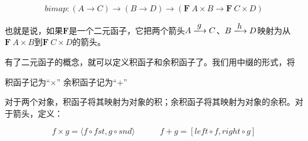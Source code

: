 \documentclass{article}
\begin{document}
\[
bimap : (A \to C) \to (B \to D) \to (\mathbf{F}\ A \times B \to \mathbf{F}\ C \times D)
\]

也就是说，如果$\mathbf{F}$是一个二元函子，它把两个箭头$A \arrowto{g} C$、$B \arrowto{h} D$映射为从$\mathbf{F}\ A \times B$到$\mathbf{F}\ C \times D$的箭头。

有了二元函子的概念，就可以定义积函子和余积函子了。我们用中缀的形式，将

\begin{center}
积函子记为“$\times$” \quad \quad \quad 余积函子记为“$+$”
\end{center}

对于两个对象，积函子将其映射为对象的积；余积函子将其映射为对象的余积。对于箭头，定义：

\[
f \times g = \langle f \circ fst, g \circ snd \rangle
\quad \quad \quad
f + g = [left \circ f, right \circ g]
\]
\end{document}
